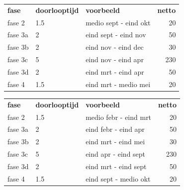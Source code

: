 \begin{framed}
    \begin{center}
	\begin{tabular}{lllr}
	    \textbf{fase} & \textbf{doorlooptijd} & \textbf{voorbeeld} & \textbf{netto}\\
	    fase 2        & 1.5  & medio sept - eind okt & 20\\
	    fase 3a       & 2    & eind sept - eind nov & 50\\
	    fase 3b       & 2    & eind nov - eind dec & 30\\
	    fase 3c       & 5    & eind nov - eind apr & 230\\
	    fase 3d       & 2    & eind mrt - eind apr & 50\\
	    fase 4        & 1.5  & eind mrt - medio mei & 20\\
	\end{tabular}
    \end{center}
 \label{fig:sept-run}
\end{framed}

\begin{framed}
    \begin{center}
	\begin{tabular}{lllr}
	    \textbf{fase} & \textbf{doorlooptijd} & \textbf{voorbeeld} & \textbf{netto}\\
	    fase 2        & 1.5  & medio febr - eind mrt & 20\\
	    fase 3a       & 2    & eind febr - eind apr & 50\\
	    fase 3b       & 2    & eind mrt - eind mei & 30\\
	    fase 3c       & 5    & eind apr - eind sept & 230\\
	    fase 3d       & 2    & eind mrt - eind sept & 50\\
	    fase 4        & 1.5  & eind sept - medio okt & 20\\
	\end{tabular}
    \end{center}
 \label{fig:febr-run}
\end{framed}
